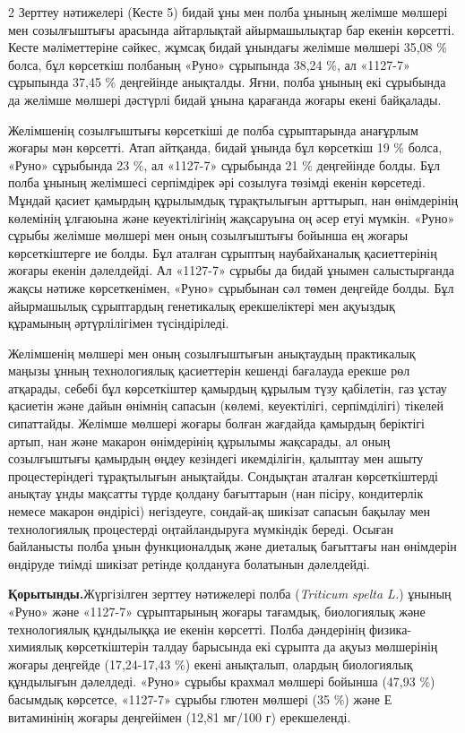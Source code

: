 \begin{multicols}{2}
Зерттеу нәтижелері (Кесте 5) бидай ұны мен полба ұнының желімше мөлшері
мен созылғыштығы арасында айтарлықтай айырмашылықтар бар екенін
көрсетті. Кесте мәліметтеріне сәйкес, жұмсақ бидай ұнындағы желімше
мөлшері 35,08 \% болса, бұл көрсеткіш полбаның «Руно» сұрыпында 38,24
\%, ал «1127-7» сұрыпында 37,45 \% деңгейінде анықталды. Яғни, полба
ұнының екі сұрыбында да желімше мөлшері дәстүрлі бидай ұнына қарағанда
жоғары екені байқалады.

Желімшенің созылғыштығы көрсеткіші де полба сұрыптарында анағұрлым
жоғары мән көрсетті. Атап айтқанда, бидай ұнында бұл көрсеткіш 19 \%
болса, «Руно» сұрыбында 23 \%, ал «1127-7» сұрыбында 21 \% деңгейінде
болды. Бұл полба ұнының желімшесі серпімдірек әрі созылуға төзімді
екенін көрсетеді. Мұндай қасиет қамырдың құрылымдық тұрақтылығын
арттырып, нан өнімдерінің көлемінің ұлғаюына және кеуектілігінің
жақсаруына оң әсер етуі мүмкін. «Руно» сұрыбы желімше мөлшері мен оның
созылғыштығы бойынша ең жоғары көрсеткіштерге ие болды. Бұл аталған
сұрыптың наубайханалық қасиеттерінің жоғары екенін дәлелдейді. Ал
«1127-7» сұрыбы да бидай ұнымен салыстырғанда жақсы нәтиже
көрсеткенімен, «Руно» сұрыбынан сәл төмен деңгейде болды. Бұл
айырмашылық сұрыптардың генетикалық ерекшеліктері мен ақуыздық құрамының
әртүрлілігімен түсіндіріледі.

Желімшенің мөлшері мен оның созылғыштығын анықтаудың практикалық маңызы
ұнның технологиялық қасиеттерін кешенді бағалауда ерекше рөл атқарады,
себебі бұл көрсеткіштер қамырдың құрылым түзу қабілетін, газ ұстау
қасиетін және дайын өнімнің сапасын (көлемі, кеуектілігі, серпімділігі)
тікелей сипаттайды. Желімше мөлшері жоғары болған жағдайда қамырдың
беріктігі артып, нан және макарон өнімдерінің құрылымы жақсарады, ал
оның созылғыштығы қамырдың өңдеу кезіндегі икемділігін, қалыптау мен
ашыту процестеріндегі тұрақтылығын анықтайды. Сондықтан аталған
көрсеткіштерді анықтау ұнды мақсатты түрде қолдану бағыттарын (нан
пісіру, кондитерлік немесе макарон өндірісі) негіздеуге, сондай-ақ
шикізат сапасын бақылау мен технологиялық процестерді оңтайландыруға
мүмкіндік береді. Осыған байланысты полба ұнын функционалдық және
диеталық бағыттағы нан өнімдерін өндіруде тиімді шикізат ретінде
қолдануға болатынын дәлелдейді.

{\bfseries Қорытынды.}Жүргізілген зерттеу нәтижелері полба (\emph{Triticum
spelta L.}) ұнының «Руно» және «1127-7» сұрыптарының жоғары тағамдық,
биологиялық және технологиялық құндылыққа ие екенін көрсетті. Полба
дәндерінің физика-химиялық көрсеткіштерін талдау барысында екі сұрыпта
да ақуыз мөлшерінің жоғары деңгейде (17,24-17,43 \%) екені анықталып,
олардың биологиялық құндылығын дәлелдеді. «Руно» сұрыбы крахмал мөлшері
бойынша (47,93 \%) басымдық көрсетсе, «1127-7» сұрыбы глютен мөлшері (35
\%) және Е витаминінің жоғары деңгейімен (12,81 мг/100 г) ерекшеленді.


\end{multicols}
